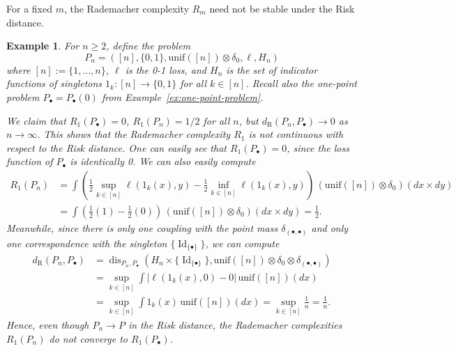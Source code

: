 \documentclass[twoside,11pt]{article}
\newtheorem{examples}[theorem]{Example}
\DeclareMathOperator{\id}{Id}
\newcommand{\dexp}[1][]{d_{\mathrm{R}#1}}
\DeclareMathOperator{\dis}{dis}
\begin{document}
For a fixed $m$, the Rademacher complexity $R_m$ need not be stable under the Risk distance.
\begin{examples}\label{ex:rademacher-discontinuous}
    For $n\geq 2$, define the problem
    \[P_n = ([n], \{0,1\}, \mathrm{unif}([n]) \otimes \delta_0, \ell, H_n)\]
    where $[n] := \{1,\dots,n\}$, $\ell$ is the 0-1 loss, and $H_n$ is the set of indicator functions of singletons $1_{k}:[n]\to \{0,1\}$ for all $k\in [n]$. Recall also the one-point problem $P_\bullet = P_\bullet(0)$ from Example~\ref{ex:one-point-problem}.

    We claim that $R_1(P_\bullet) = 0$, $R_1(P_n) = 1/2$ for all $n$, but $\dexp(P_n,P_\bullet)\to 0$ as $n\to \infty$. This shows that the Rademacher complexity  $R_1$ is not continuous with respect to the Risk distance.  
    One can easily see that $R_1(P_\bullet)=0$, since the loss function of $P_\bullet$ is identically 0. We can also easily compute
    \begin{align*}
        R_1(P_n) & = \int \left(\frac{1}{2} \sup_{k\in [n]} \ell(1_{k}(x),y) - \frac{1}{2}\inf_{k\in [n]} \ell(1_{k}(x),y) \right)\, (\mathrm{unif}([n])\otimes \delta_0)(dx\times dy)
        \\ & =
        \int \left(\frac{1}{2} (1) - \frac{1}{2}(0) \right)\, (\mathrm{unif}([n])\otimes \delta_0)(dx\times dy) = \frac{1}{2}.
    \end{align*}
    Meanwhile, since there is only one coupling with the point mass $\delta_{(\bullet,\bullet)}$ and only one correspondence with the singleton $\{\id_{\{\bullet\}}\}$, we can compute
    \begin{align*}
        \dexp(P_n,P_\bullet) & =
        \dis_{P_n,P_\bullet}(H_n \times \{\id_{\{\bullet\}}\}, \mathrm{unif}([n]) \otimes \delta_0\otimes \delta_{(\bullet,\bullet)})
        \\ & =
        \sup_{k\in[n]}\int |\ell(1_{k}(x),0) - 0| \, \mathrm{unif}([n])(dx)
        \\ & =
        \sup_{k\in[n]}\int 1_{k}(x) \, \mathrm{unif}([n])(dx)
        = \sup_{k\in [n]} \frac{1}{n} = \frac{1}{n}.
    \end{align*}
    Hence, even though $P_n \to P$ in the Risk distance, the Rademacher complexities $R_1(P_n)$ do not converge to $R_1(P_\bullet)$.
\end{examples}
\end{document}
